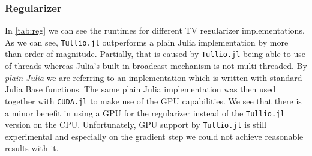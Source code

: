 \documentclass{juliacon}
\begin{document}
        \subsubsection{Regularizer}
            In \autoref{tab:reg} we can see the runtimes for different TV regularizer implementations. As we can see, \verb|Tullio.jl| outperforms a plain 
            Julia implementation by more than order of magnitude. Partially, that is caused by \verb|Tullio.jl|
            being able to 
            use of threads whereas Julia's built in broadcast mechanism is not multi threaded.
            By \textit{plain Julia} we are referring to an implementation which is written with standard Julia Base functions.
            The same plain Julia implementation was then used together with \verb|CUDA.jl|
            to make use of the GPU capabilities. We see that there is a minor benefit in using a GPU for the regularizer instead of 
            the \verb|Tullio.jl| version on the CPU. Unfortunately, GPU support by \verb|Tullio.jl| is still experimental and especially on the gradient step 
            we could not achieve reasonable results with it.
\end{document}
